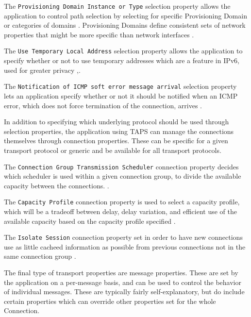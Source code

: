 The \texttt{Provisioning Domain Instance or Type} selection
property allows the application
to control path selection by selecting for specific Provisioning
Domain or categories of domains
\cite{paulyArchitectureRequirementsTransport2025}. Provisioning
Domains define consistent sets of network properties that might
be more specific than network interfaces
\cite{paulyArchitectureRequirementsTransport2025}.

The \texttt{Use Temporary Local Address} selection property
allows the application to specify
whether or not to use temporary addresses which are a feature in
IPv6, used for greater privacy
\cite{gontTemporaryAddressExtensions2021},\cite{paulyArchitectureRequirementsTransport2025}.

The \texttt{Notification of ICMP soft error message arrival}
selection property lets an application specify whether or 
not it should be notified when an ICMP
error, which does not force termination of the connection,
arrives \cite{paulyArchitectureRequirementsTransport2025}.

In addition to specifying which underlying protocol should be
used through selection properties, the application using TAPS
can manage the connections
themselves through connection properties. These can be specific
for a given transport protocol
or generic and be available for all transport protocols.

The \texttt{Connection Group Transmission Scheduler} connection 
property decides which scheduler is used within a given
connection group, to divide the available capacity between the
connections. \cite{paulyArchitectureRequirementsTransport2025}.

The \texttt{Capacity Profile} connection property is used to
select a capacity profile, which will be a tradeoff between
delay, delay variation, and efficient use of the available
capacity based on the capacity profile specified
\cite{paulyArchitectureRequirementsTransport2025}.

The \texttt{Isolate Session} connection property set in order to
have new connections use as little cacheed information as
possible from previous connections not in the same connection
group \cite{paulyArchitectureRequirementsTransport2025}.

The final type of transport properties are message properties.
These are set by the application on a per-message basis, and
can be used to control the behavior of individual messages.
These are typically fairly self-explanatory, but do
include certain properties which can override other properties
set for the whole Connection.

